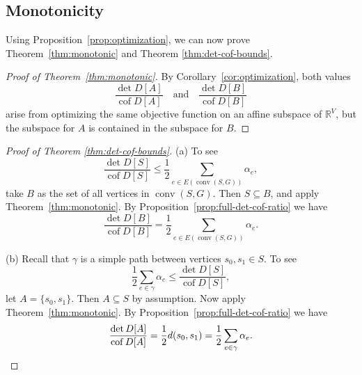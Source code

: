 \documentclass[12pt]{amsart}
\theoremstyle{definition}
\newcommand{\RR}{\mathbb{R}}
\DeclareMathOperator{\cof}{cof}
\DeclareMathOperator{\conv}{conv}
\begin{document}
\subsection{Monotonicity}


Using Proposition~\ref{prop:optimization}, we can now prove Theorem~\ref{thm:monotonic} and Theorem \ref{thm:det-cof-bounds}.

\begin{proof}[Proof of Theorem~\ref{thm:monotonic}]
By Corollary~\ref{cor:optimization}, both values 
\[ 
	\frac{\det D[A]}{\cof D[A]}\quad \text{and} \quad  \frac{\det D[B]}{\cof D[B]}
\] 
arise from optimizing the same objective function on an affine subspace of $\RR^V$, 
but the subspace for $A$ is contained in the subspace for $B$.
\end{proof}

\begin{proof}[Proof of Theorem \ref{thm:det-cof-bounds}]
(a)
To see
\begin{equation*}
	\frac{\det D[S]}{\cof D[S]} \leq \frac12 \sum_{e \in E(\conv(S, G))} \alpha_e ,
\end{equation*}
take $B$ as the set of all vertices in $\conv(S, G)$.
Then $S \subseteq B$, and apply Theorem~\ref{thm:monotonic}.
By Proposition~\ref{prop:full-det-cof-ratio} we have
\[
	\frac{\det D[B]}{\cof D[B]} = \frac12 \sum_{e \in E(\conv(S, G))} \alpha_e .
\]

(b) 
Recall that $\gamma$ is a simple path between vertices $s_0, s_1 \in S$.
To see
\begin{equation*}
	\frac12 \sum_{e \in \gamma} \alpha_e \leq \frac{\det D[S]}{\cof D[S]},
\end{equation*}
let $A=\{s_0, s_1\}$.
Then $A \subseteq S$ by assumption. Now apply Theorem~\ref{thm:monotonic}.
By Proposition~\ref{prop:full-det-cof-ratio} we have
\[
	\frac{\det D[A]}{\cof D[A]}
	= \frac12 d(s_0, s_1) 
	= \frac12 \sum_{e \in \gamma} \alpha_e .
	\qedhere
\]
\end{proof}
\end{document}
